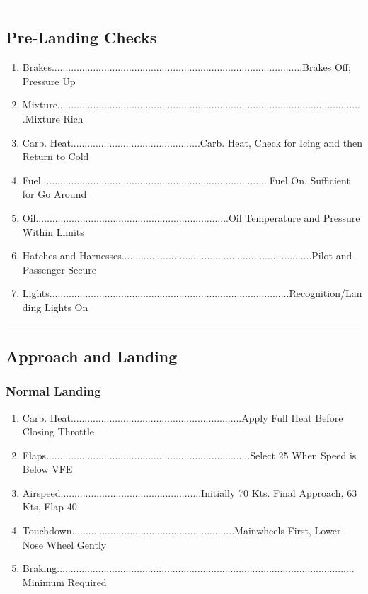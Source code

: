 \documentclass[a4paper]{article}
\newenvironment{numberedchecklist}{
  \begin{enumerate}[label=\arabic*., leftmargin=*, align=left]
    \setlength{\itemsep}{2pt}
    \setlength{\parskip}{0pt}
    \setlength{\parsep}{0pt}
}{
  \end{enumerate}
}
\begin{document}
\rule{\linewidth}{0.4pt}

\subsection*{Pre-Landing Checks}
\begin{numberedchecklist}
\item Brakes...........................................................................................Brakes Off; Pressure Up
\item Mixture...............................................................................................................Mixture Rich
\item Carb. Heat...............................................Carb. Heat, Check for Icing and then Return to Cold
\item Fuel...................................................................................Fuel On, Sufficient for Go Around
\item Oil......................................................................Oil Temperature and Pressure Within Limits
\item Hatches and Harnesses.....................................................................Pilot and Passenger Secure
\item Lights.......................................................................................Recognition/Landing Lights On
\end{numberedchecklist}

\rule{\linewidth}{0.4pt}

\subsection*{Approach and Landing}

\subsubsection*{Normal Landing}
\begin{numberedchecklist}
\item Carb. Heat..............................................................Apply Full Heat Before Closing Throttle
\item Flaps..........................................................................Select 25\textdegree{} When Speed is Below VFE
\item Airspeed...................................................Initially 70 Kts. Final Approach, 63 Kts, Flap 40\textdegree{}
\item Touchdown...........................................................Mainwheels First, Lower Nose Wheel Gently
\item Braking............................................................................................................Minimum Required
\end{numberedchecklist}
\end{document}
